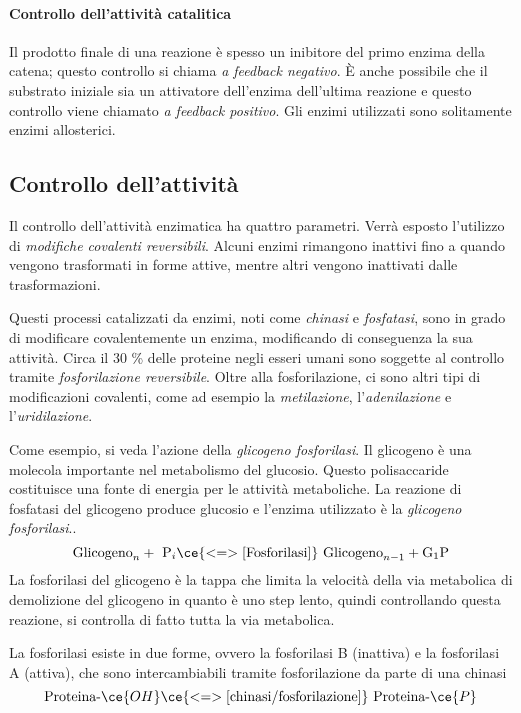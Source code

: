\paragraph{Controllo dell'attività catalitica}

Il prodotto finale di una reazione è spesso un inibitore del primo enzima della catena; questo controllo si chiama \emph{a feedback negativo}. È anche possibile che il substrato iniziale sia un attivatore dell'enzima dell'ultima reazione e questo controllo viene chiamato \emph{a feedback positivo}. Gli enzimi utilizzati sono solitamente enzimi allosterici.

\subsection{Controllo dell'attività}

Il controllo dell'attività enzimatica ha quattro parametri. Verrà esposto l'utilizzo di \emph{modifiche covalenti reversibili}.
Alcuni enzimi rimangono inattivi fino a quando vengono trasformati in forme attive, mentre altri vengono inattivati dalle trasformazioni.


Questi processi catalizzati da enzimi, noti come \emph{chinasi} e \emph{fosfatasi}, sono in grado di modificare covalentemente un enzima, modificando di conseguenza la sua attività. Circa il 30 \% delle proteine negli esseri umani sono soggette al controllo tramite \emph{fosforilazione reversibile}. Oltre alla fosforilazione, ci sono altri tipi di modificazioni covalenti, come ad esempio la \emph{metilazione}, l'\emph{adenilazione} e l'\emph{uridilazione}.

Come esempio, si veda l'azione della \emph{glicogeno fosforilasi}. Il glicogeno è una molecola importante nel metabolismo del glucosio. Questo polisaccaride costituisce una fonte di energia per le attività metaboliche. La reazione di fosfatasi del glicogeno produce glucosio e l'enzima utilizzato è la \emph{glicogeno fosforilasi}..
\[
\text{Glicogeno}_n + \text{ P}_i \ce{<=>[\text{Fosforilasi}]} \text{ Glicogeno}_{n-1} + \text{G}_1\text{P}
\]
La fosforilasi del glicogeno è la tappa che limita la velocità della via metabolica di demolizione del glicogeno in quanto è uno step lento, quindi controllando questa reazione, si controlla di fatto tutta la via metabolica.

La fosforilasi esiste in due forme, ovvero la fosforilasi B (inattiva) e la fosforilasi A (attiva), che sono intercambiabili tramite fosforilazione da parte di una chinasi
\[
\text{Proteina-}\ce{OH} \ce{<=>[\text{chinasi/fosforilazione}]} \text{ Proteina-}\ce{P}
\]

